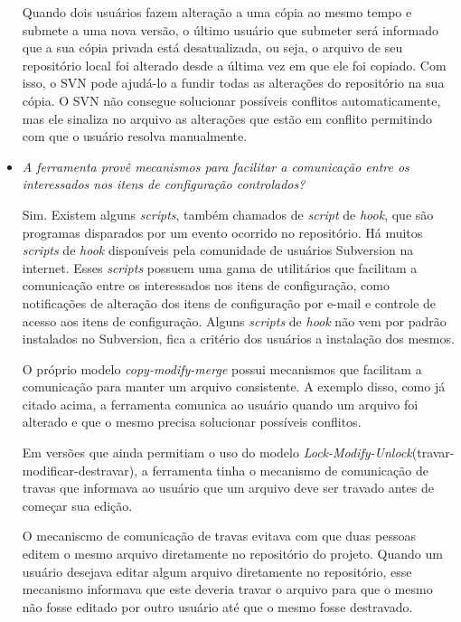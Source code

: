 \begin{itemize}
  Quando dois usuários fazem alteração a uma cópia ao mesmo tempo e submete a uma nova versão, o último usuário que submeter será informado
  que a sua cópia privada está desatualizada, ou seja, o arquivo de seu repositório local foi alterado desde a 
  última vez em que ele foi copiado. Com isso, o SVN pode ajudá-lo a fundir todas as alterações do repositório na sua cópia. 
  O SVN não consegue solucionar possíveis conflitos automaticamente, mas ele sinaliza no arquivo as alterações que estão em conflito
   permitindo com que o usuário resolva manualmente.
   
     \item \textit{A ferramenta provê mecanismos para facilitar a comunicação entre os interessados nos itens de
  configuração controlados?}
  
  Sim. Existem alguns \textit{scripts}, também chamados de \textit{script} de \textit{hook}, que são programas disparados por um evento ocorrido no repositório\cite{svn-book}.
  Há muitos \textit{scripts} de \textit{hook} disponíveis pela comunidade de usuários Subversion na internet. Esses \textit{scripts} possuem uma gama de utilitários que facilitam 
  a comunicação entre os interessados nos itens de configuração, como notificações de alteração dos itens de configuração por e-mail 
  e controle de acesso aos itens de configuração. Alguns \textit{scripts} de \textit{hook} não vem por padrão instalados no Subversion, fica a critério dos usuários a instalação dos mesmos.
  
  O próprio modelo \textit{copy-modify-merge} possui mecanismos que facilitam a comunicação para manter um arquivo consistente.
  A exemplo disso, como já citado acima, a ferramenta comunica ao usuário quando um arquivo foi alterado e que o mesmo precisa solucionar
  possíveis conflitos.
  
  Em versões que ainda permitiam o uso do modelo \textit{Lock-Modify-Unlock}(travar-modificar-destravar), a ferramenta tinha o mecanismo de comunicação de travas que informava ao usuário que um arquivo deve ser travado antes 
  de começar sua edição. 
  
  O mecaniscmo de comunicação de travas evitava com que duas pessoas editem o mesmo arquivo diretamente no repositório do projeto. Quando
  um usuário desejava editar algum arquivo diretamente no repositório, esse mecanismo informava que este deveria travar o arquivo para que o mesmo 
  não fosse editado por outro usuário até que o mesmo fosse destravado.
\end{itemize}

